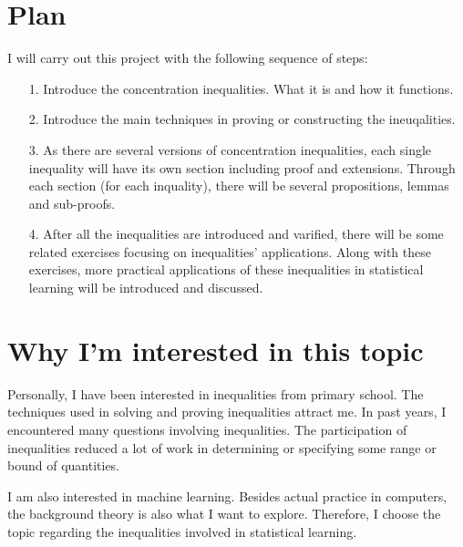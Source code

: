 \documentclass[]{STAT_547C}
\begin{document}
\section{Plan}

I will carry out this project with the following sequence of steps: 
\begin{enumerate}
  \item[1.]
  Introduce the concentration inequalities. What it is and how it functions. 
  \item[2.]
  Introduce the main techniques in proving or constructing the ineuqalities.
  \item[3.]
  As there are several versions of concentration inequalities, each single inequality will have its 
  own section including proof and extensions. Through each section (for each inquality), there will 
  be several propositions, lemmas and sub-proofs. 
  \item[4.] 
  After all the inequalities are introduced and varified, there will be some related exercises focusing 
  on inequalities' applications. Along with these exercises, more practical applications of these inequalities
  in statistical learning will be introduced and discussed. 
\end{enumerate}


\section{Why I'm interested in this topic}

Personally, I have been interested in inequalities from primary school. The techniques used in solving and proving 
inequalities attract me. In past years, I encountered many questions involving inequalities. The participation of 
inequalities reduced a lot of work in determining or specifying some range or bound of quantities. 

I am also interested in machine learning. Besides actual practice in computers, the background theory is also what 
I want to explore. Therefore, I choose the topic regarding the inequalities involved in statistical learning. 


\printbibliography
\end{document}
